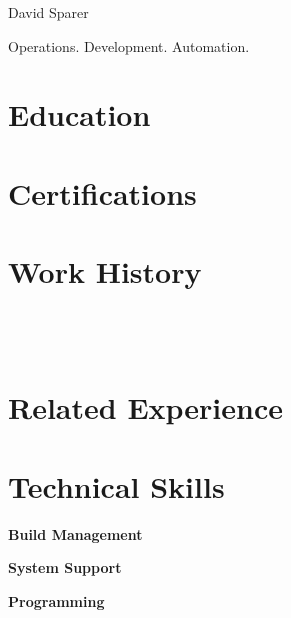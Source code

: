 \documentclass{cls/res}
\begin{document}
	\thispagestyle{empty} %

	\begin{resume}
		\vspace{-0.5in}
		\begin{minipage}[c]{0.78\textwidth}
			\centerline{{\Huge David Sparer}}
			\vspace{.2in}
			\centerline{Operations. Development. Automation.}
		\end{minipage}
		\begin{minipage}[c]{0.25\textwidth}
			
		\end{minipage}

		\section{Education}
			\vspace{0.1in}
			

		\section{Certifications}
			\vspace{0.1in}
			

		\section{Work History}
			\vspace{0.1in}
			
			
			
			
			
			\\\\
			

		\section{Related Experience}
			\vspace{0.1in}
			

		\section{Technical Skills}
			\vspace{0.1in}
			{\bf Build Management}
				\vspace{-0.1in}
				
			\vspace{-0.1in}
			{\bf System Support}
				\vspace{-0.1in}
				
			\vspace{-0.1in}
			{\bf Programming}
				\vspace{-0.1in}
				

	\end{resume}
\end{document}
